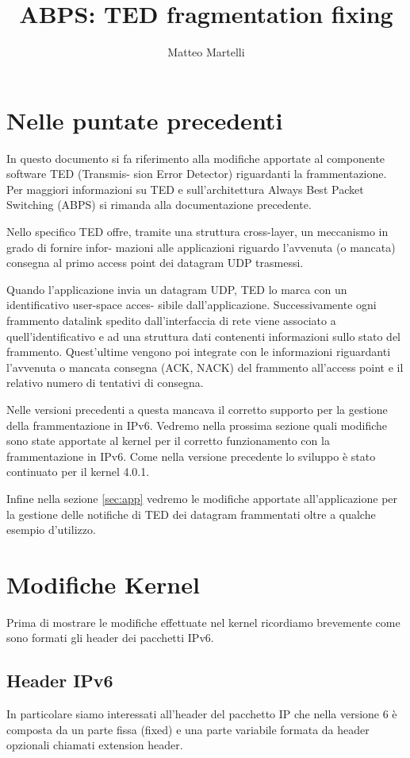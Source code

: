\documentclass[a4paper,10pt]{article}
\title{ABPS: TED fragmentation fixing}
\author{Matteo Martelli}
\begin{document}
\lstset{language=C}
\maketitle


\section{Nelle puntate precedenti}
In questo documento si fa riferimento alla modifiche apportate al componente software TED (Transmis-
sion Error Detector) riguardanti la frammentazione. Per maggiori informazioni su TED e sull’architettura
Always Best Packet Switching (ABPS) si rimanda alla documentazione
precedente. %

Nello specifico TED offre, tramite una struttura cross-layer, un meccanismo in grado di fornire infor-
mazioni alle applicazioni riguardo l’avvenuta (o mancata) consegna al primo access point dei datagram
UDP trasmessi.

Quando l’applicazione invia un datagram UDP, TED lo marca con un identificativo user-space acces-
sibile dall’applicazione. Successivamente ogni frammento datalink spedito dall’interfaccia di rete viene
associato a quell’identificativo e ad una struttura dati contenenti informazioni sullo stato del frammento.
Quest’ultime vengono poi integrate con le informazioni riguardanti l’avvenuta o mancata consegna (ACK,
NACK) del frammento all’access point e il relativo numero di tentativi di consegna.

Nelle versioni precedenti a questa mancava il corretto supporto per la gestione della frammentazione
in IPv6. Vedremo nella prossima sezione quali modifiche sono state apportate al kernel per il corretto
funzionamento con la frammentazione in IPv6. Come nella versione
precedente lo sviluppo è stato continuato per il kernel 4.0.1.

Infine nella sezione \ref{sec:app} vedremo le modifiche apportate all’applicazione per la gestione delle notifiche
di TED dei datagram frammentati oltre a qualche esempio d’utilizzo.


\section{Modifiche Kernel}
Prima di mostrare le modifiche effettuate nel kernel ricordiamo
brevemente come sono formati gli header dei pacchetti IPv6.

\subsection{Header IPv6}
In particolare siamo interessati all'header del pacchetto IP che nella
versione 6 è composta da un parte fissa (fixed) e una parte variabile
formata da header opzionali chiamati extension header. \\
\end{document}
